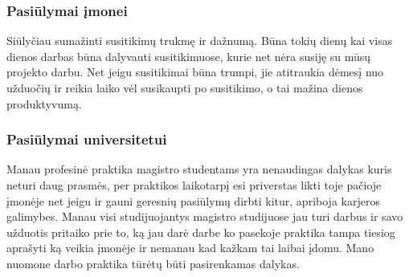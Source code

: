 \documentclass{VUMIFPSkursinis}
\begin{document}
		\subsubsection{Pasiūlymai įmonei}
			Siūlyčiau sumažinti susitikimų trukmę ir dažnumą. Būna tokių dienų kai visas dienos darbas būna dalyvauti susitikimuose, kurie net nėra susiję su mūsų 
			projekto darbu. Net jeigu susitikimai būna trumpi, jie atitraukia dėmesį nuo užduočių ir reikia laiko vėl susikaupti po susitikimo, o tai mažina dienos produktyvumą.
		\subsubsection{Pasiūlymai universitetui}
			Manau profesinė praktika magistro studentams yra nenaudingas dalykas kuris neturi daug prasmės, per praktikos laikotarpį esi priverstas likti toje pačioje įmonėje net jeigu ir gauni geresnių pasiūlymų dirbti kitur, apriboja karjeros galimybes.
			Manau visi studijuojantys magistro studijuose jau turi darbus ir savo užduotis pritaiko prie to, ką jau darė darbe ko pasekoje praktika tampa tiesiog aprašyti ką veikia įmonėje ir nemanau kad kažkam tai laibai įdomu.
			Mano nuomone darbo praktika tūrėtų būti pasirenkamas dalykas.
			
		
\printbibliography[heading=bibintoc]
\end{document}
